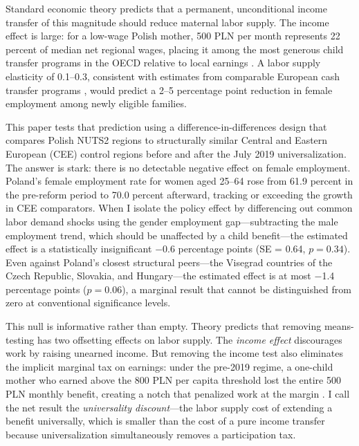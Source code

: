 \documentclass[12pt]{article}
\begin{document}
Standard economic theory predicts that a permanent, unconditional income transfer of this magnitude should reduce maternal labor supply. The income effect is large: for a low-wage Polish mother, 500 PLN per month represents 22 percent of median net regional wages, placing it among the most generous child transfer programs in the OECD relative to local earnings \citep{oecd2019}. A labor supply elasticity of 0.1--0.3, consistent with estimates from comparable European cash transfer programs \citep{blundell2016, bargain2014}, would predict a 2--5 percentage point reduction in female employment among newly eligible families.

This paper tests that prediction using a difference-in-differences design that compares Polish NUTS2 regions to structurally similar Central and Eastern European (CEE) control regions before and after the July 2019 universalization. The answer is stark: there is no detectable negative effect on female employment. Poland's female employment rate for women aged 25--64 rose from 61.9 percent in the pre-reform period to 70.0 percent afterward, tracking or exceeding the growth in CEE comparators. When I isolate the policy effect by differencing out common labor demand shocks using the gender employment gap---subtracting the male employment trend, which should be unaffected by a child benefit---the estimated effect is a statistically insignificant $-$0.6 percentage points (SE = 0.64, $p = 0.34$). Even against Poland's closest structural peers---the Visegrad countries of the Czech Republic, Slovakia, and Hungary---the estimated effect is at most $-$1.4 percentage points ($p = 0.06$), a marginal result that cannot be distinguished from zero at conventional significance levels.

This null is informative rather than empty. Theory predicts that removing means-testing has two offsetting effects on labor supply. The \textit{income effect} discourages work by raising unearned income. But removing the income test also eliminates the implicit marginal tax on earnings: under the pre-2019 regime, a one-child mother who earned above the 800 PLN per capita threshold lost the entire 500 PLN monthly benefit, creating a notch that penalized work at the margin \citep{kleven2016}. I call the net result the \textit{universality discount}---the labor supply cost of extending a benefit universally, which is smaller than the cost of a pure income transfer because universalization simultaneously removes a participation tax.
\end{document}
